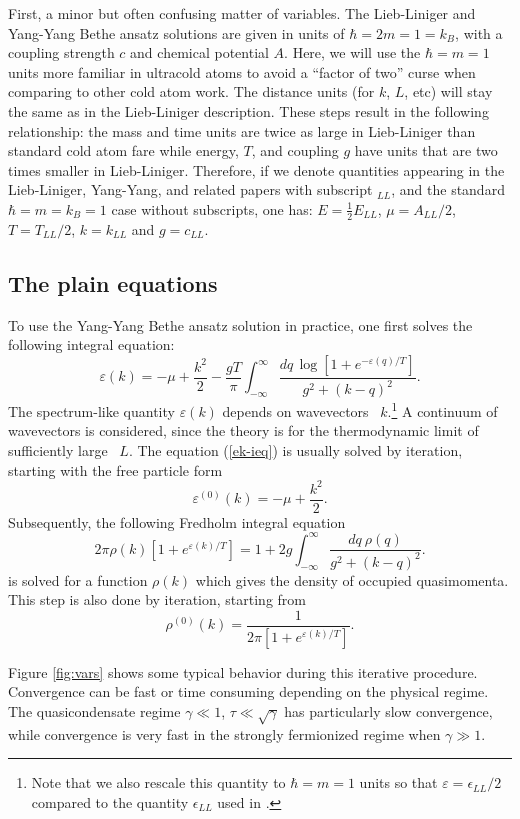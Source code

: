 \documentclass[aps,twocolumn,pra,superscriptaddress,nofootinbib,amsmath,amssymb,floats,floatfix,english]{revtex4-1}
\newcommand{\eqn}[1]{(\ref{#1})}
\renewcommand{\eq}[2]{\begin{equation}\label{#1}#2\end{equation}}
\newcommand{\ve}{\varepsilon}
\begin{document}
First, a minor but often confusing matter of variables. The Lieb-Liniger \cite{Lieb63,Lieb63b} and Yang-Yang Bethe ansatz solutions are given in units of $\hbar=2m=1=k_B$, with a coupling strength $c$ and chemical potential $A$.
Here, we will use the $\hbar=m=1$ units more familiar in ultracold atoms to avoid a ``factor of two'' curse when comparing to other cold atom work.
The distance units (for $k$, $L$, etc) will stay the same as in the Lieb-Liniger description. 
These steps result in the following relationship:  the mass and time units are twice as large in Lieb-Liniger than standard cold atom fare
while energy, $T$, and coupling $g$ have units that are two times smaller in Lieb-Liniger. 
Therefore, if we denote quantities appearing in the Lieb-Liniger, Yang-Yang, and related papers with subscript ${}_{LL}$, and the standard 
 $\hbar=m=k_B=1$ case without subscripts, one has:
$E=\frac{1}{2}E_{LL}$, $\mu=A_{LL}/2$, $T=T_{LL}/2$, $k=k_{LL}$ and $g=c_{LL}$.


\subsection{The plain equations} 
\label{EQS}
To use the Yang-Yang Bethe ansatz solution \cite{Yang69} in practice, one first solves the following integral equation:
\eq{ek-ieq}{
\ve(k) = -\mu + \frac{k^2}{2} -\frac{gT}{\pi} \int_{-\infty}^{\infty} \frac{dq\,\log\left[1+e^{-\ve(q)/T}\right]}{g^2+(k-q)^2}.
}
The spectrum-like quantity $\ve(k)$ depends on wavevectors~ $k$.\footnote{Note that we also rescale this quantity to $\hbar=m=1$ units so that $\ve=\epsilon_{LL}/2$ compared to the quantity $\epsilon_{LL}$ used in \cite{Yang69}.}
A continuum of wavevectors is considered, since the theory is for the thermodynamic limit of sufficiently large~ $L$.
The equation \eqn{ek-ieq}  is usually solved by iteration, starting with the free particle form
\eq{iter0}{
\ve^{(0)}(k) = -\mu + \frac{k^2}{2}.
}
Subsequently, the following Fredholm integral equation
\eq{rhok-ieq}{
2\pi\rho(k)\left[1+e^{\ve(k)/T}\right] = 
1 + 2g \int_{-\infty}^{\infty} \frac{dq\ \rho(q)}{g^2+(k-q)^2}.
}
is solved for a function $\rho(k)$ which gives the density of occupied quasimomenta.
This step is also done by iteration, starting from
\eq{iter0-rho}{
\rho^{(0)}(k) = \frac{1}{2\pi\left[1+e^{\ve(k)/T}\right]}.
}

Figure \ref{fig:vars} shows some typical behavior during this iterative procedure.
Convergence can be fast or time consuming depending on the physical regime. The quasicondensate regime $\gamma\ll1$, $\tau\ll\sqrt{\gamma}$ has particularly slow convergence,
while convergence is very fast in the strongly fermionized regime when $\gamma\gg1$.
\end{document}
